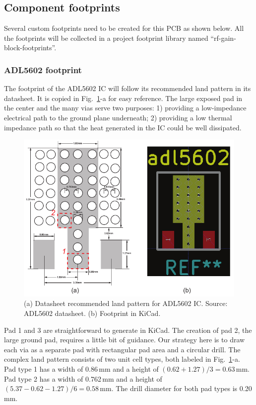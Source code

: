 \documentclass[12pt,letterpaper]{scrartcl}
\begin{document}
\subsection{Component footprints}
Several custom footprints need to be created for this PCB as shown below. All the footprints will be collected in a project footprint library named ``rf-gain-block-footprints''. 

\subsubsection{ADL5602 footprint}

The footprint of the ADL5602 IC will follow its recommended land pattern in its datasheet. It is copied in Fig.~\ref{fig:adl5602-landpattern}-a for easy reference. The large exposed pad in the center and the many vias serve two purposes: 1) providing a low-impedance electrical path to the ground plane underneath; 2) providing a low thermal impedance path so that the heat generated in the IC could be well dissipated. 

\begin{figure}[ht]
	\centering
	\includegraphics[width=4.5in]{adl5602-landpattern}
	\caption{(a) Datasheet recommended land pattern for ADL5602 IC. Source: ADL5602 datasheet. (b) Footprint in KiCad.}
	\label{fig:adl5602-landpattern}
\end{figure}

Pad 1 and 3 are straightforward to generate in KiCad. The creation of pad 2, the large ground pad, requires a little bit of guidance. Our strategy here is to draw each via as a separate pad with rectangular pad area and a circular drill. The complex land pattern consists of two unit cell types, both labeled  in Fig.~\ref{fig:adl5602-landpattern}-a. Pad type 1 has a width of 0.86\,mm and a height of $(0.62+1.27)/3=0.63$\,mm. Pad type 2 has a width of 0.762\,mm and a height of $(5.37-0.62-1.27)/6=0.58$\,mm. The drill diameter for both pad types is 0.20\,mm. 
\end{document}

